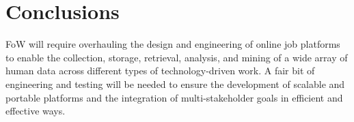 \documentclass[11pt]{article}
\begin{document}

















\section{Conclusions}
FoW will require overhauling the design and engineering of online job platforms to enable the collection, storage, retrieval, analysis, and mining of a wide array of human data across different types of technology-driven work. A fair bit of engineering and testing will be needed to ensure the development of scalable and portable platforms and the integration of multi-stakeholder goals in efficient and effective ways.
\end{document}

